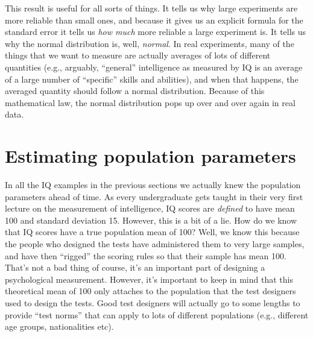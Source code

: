 This result is useful for all sorts of things. It tells us why large experiments are more reliable than small ones, and because it gives us an explicit formula for the standard error it tells us {\it how much} more reliable a large experiment is. It tells us why the normal distribution is, well, {\it normal}. In real experiments, many of the things that we want to measure are actually averages of lots of different quantities (e.g., arguably, ``general'' intelligence as measured by IQ is an average of a large number of ``specific'' skills and abilities), and when that happens, the averaged quantity should follow a normal distribution. Because of this mathematical law, the normal distribution pops up over and over again in real data. 


\section{Estimating population parameters~\label{sec:pointestimates}}

In all the IQ examples in the previous sections we actually knew the population parameters ahead of time. As every undergraduate gets taught in their very first lecture on the measurement of intelligence, IQ scores are {\it defined} to have mean 100 and standard deviation 15. However, this is a bit of a lie. How do we know that IQ scores have a true population mean of 100? Well, we know this because the people who designed the tests have administered them to very large samples, and have then ``rigged'' the scoring rules so that their sample has mean 100. That's not a bad thing of course, it's an important part of designing a psychological measurement. However, it's important to keep in mind that this theoretical mean of 100 only attaches to the population that the test designers used to design the tests. Good test designers will actually go to some lengths to provide ``test norms'' that can apply to lots of different populations (e.g., different age groups, nationalities etc). 


